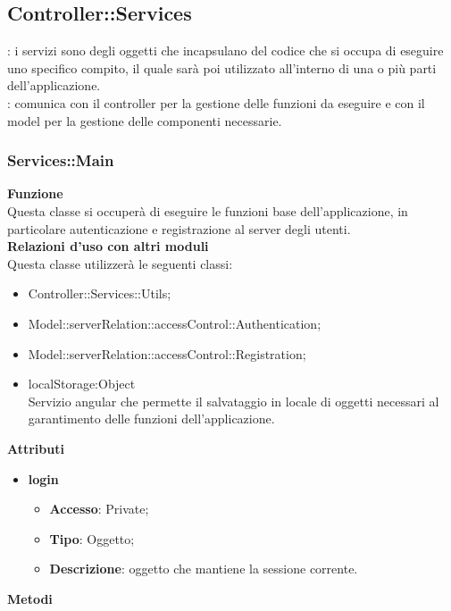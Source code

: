 {	\subsection {Controller::\-Services}{
		\label{sec:services}
		\textbf{\tipo}: i servizi sono degli oggetti che incapsulano del codice che si occupa di eseguire uno specifico compito, il quale sarà poi utilizzato all’interno di una o più parti dell’applicazione.\\
		\textbf{\relaz}: comunica con il controller per la gestione delle funzioni da eseguire e con il model per la gestione delle componenti necessarie.

		\subsubsection{Services::\-Main}{
			\label{sub:servicesMain}
			\textbf{Funzione}\\
			\indent Questa classe si occuperà di eseguire le funzioni base dell'applicazione, in particolare autenticazione e registrazione al server degli utenti.\\
			\textbf{Relazioni d'uso con altri moduli}\\
			\indent Questa classe utilizzerà le seguenti classi:
			\begin{itemize}
				\item Controller::Services::\-Utils;
				\item Model::serverRelation::accessControl::Authentication;
				\item Model::serverRelation::accessControl::Registration;
				\item localStorage:Object\\
					\indent Servizio angular che permette il salvataggio in locale di oggetti necessari al garantimento delle funzioni dell'applicazione.
			\end{itemize}
			\textbf{Attributi}
			\begin{itemize}
				\item \textbf{login}
				\begin{itemize}
					\item \textbf{Accesso}: Private;
					\item \textbf{Tipo}: Oggetto;
					\item \textbf{Descrizione}: oggetto che mantiene la sessione corrente.
				\end{itemize}
			\end{itemize}
			\textbf{Metodi}
			\begin{itemize}

\end{itemize}}}}
